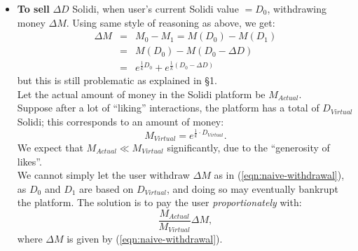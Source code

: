 \begin{itemize}
	\item \textbf{To sell} $\Delta D$ Solidi, when user's current Solidi value $= D_0$, withdrawing money $\Delta M$.  Using same style of reasoning as above, we get:
 		\begin{eqnarray}
			\Delta M &=& M_0 - M_1 = M(D_0) - M(D_1) \nonumber \\
			&=& M(D_0) - M(D_0 - \Delta D) \nonumber \\
			&=& e^{\frac{1}{k} D_0} + e^{\frac{1}{k} (D_0 - \Delta D)}
 			\label{eqn:naive-withdrawal}
		\end{eqnarray}
	but this is still problematic as explained in \S1. \\
	Let the actual amount of money in the Solidi platform be $M_{Actual}$. \\
	Suppose after a lot of ``liking'' interactions, the platform has a total of $D_{Virtual}$ Solidi;  this corresponds to an amount of money:
	\begin{equation}
		M_{Virtual} = e^{\frac{1}{k} \cdot D_{Virtual}} .
	\end{equation}
	We expect that $M_{Actual} \ll M_{Virtual}$ significantly, due to the ``generosity of likes''. \\
	We cannot simply let the user withdraw $\Delta M$ as in (\ref{eqn:naive-withdrawal}), as $D_0$ and $D_1$ are based on $D_{Virtual}$, and doing so may eventually bankrupt the platform.  The solution is to pay the user \textit{proportionately} with:
	\begin{equation}
		\frac{M_{Actual}}{M_{Virtual}} \Delta M ,
	\end{equation}
	where $\Delta M$ is given by (\ref{eqn:naive-withdrawal}).


\end{itemize}

\section{}

